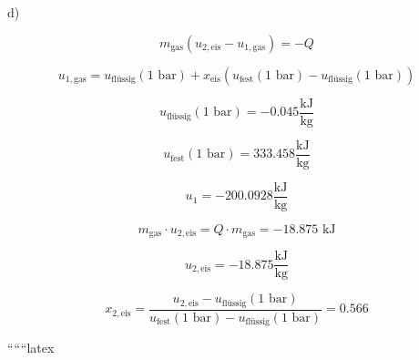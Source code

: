 d)

\[
m_{\text{gas}} (u_{2,\text{eis}} - u_{1,\text{gas}}) = -Q
\]

\[
u_{1,\text{gas}} = u_{\text{flüssig}} (1 \text{ bar}) + x_{\text{eis}} (u_{\text{fest}} (1 \text{ bar}) - u_{\text{flüssig}} (1 \text{ bar}))
\]

\[
u_{\text{flüssig}} (1 \text{ bar}) = -0.045 \frac{\text{kJ}}{\text{kg}}
\]

\[
u_{\text{fest}} (1 \text{ bar}) = 333.458 \frac{\text{kJ}}{\text{kg}}
\]

\[
u_1 = -200.0928 \frac{\text{kJ}}{\text{kg}}
\]

\[
m_{\text{gas}} \cdot u_{2,\text{eis}} = Q \cdot m_{\text{gas}} = -18.875 \text{ kJ}
\]

\[
u_{2,\text{eis}} = -18.875 \frac{\text{kJ}}{\text{kg}}
\]

\[
x_{2,\text{eis}} = \frac{u_{2,\text{eis}} - u_{\text{flüssig}} (1 \text{ bar})}{u_{\text{fest}} (1 \text{ bar}) - u_{\text{flüssig}} (1 \text{ bar})} = 0.566
\]

``````latex